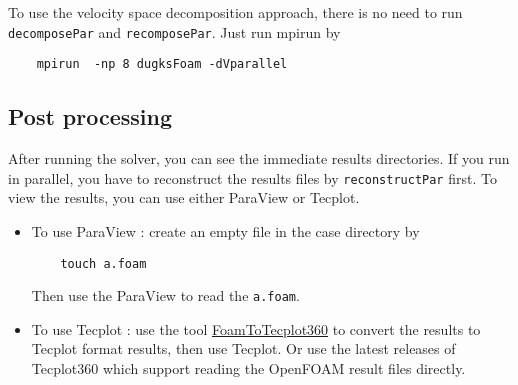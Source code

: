 To use the velocity space decomposition approach, there is no need to run \verb|decomposePar| and \verb|recomposePar|.
Just run mpirun by
\begin{verbatim}
    mpirun  -np 8 dugksFoam -dVparallel
\end{verbatim}

\subsection{Post processing}
After running the solver, you can see the immediate results directories.
If you run in parallel, you have to reconstruct the results files by \verb|reconstructPar| first.
To view the results, you can use either ParaView or Tecplot.
\begin{itemize}
\item To use ParaView : create an empty file in the case directory by
\begin{verbatim}
    touch a.foam
\end{verbatim}
Then use the ParaView to read the \verb|a.foam|.
\item To use Tecplot : use the tool \href{https://openfoamwiki.net/index.php/FoamToTecplot360}{FoamToTecplot360} to convert the results to Tecplot format results, then use Tecplot.
 Or use the latest releases of Tecplot360 which support reading the OpenFOAM result files directly.
\end{itemize}
